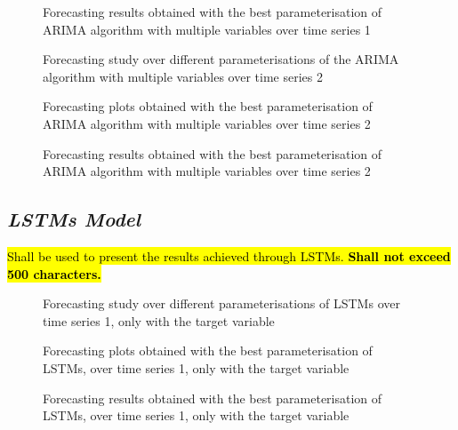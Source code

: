 \documentclass[10pt]{extarticle}
\newcommand{\ctext}[3][RGB]{%
  \begingroup
  \definecolor{hlcolor}{#1}{#2}\sethlcolor{hlcolor}%
  \hl{#3}%
  \endgroup
}
\begin{document}
\begin{figure}[H]
\caption{Forecasting results obtained with the best parameterisation of ARIMA algorithm with multiple variables over time series 1}
\end{figure}

\begin{figure}[H]
\caption{Forecasting study over different parameterisations of the ARIMA algorithm with multiple variables over time series 2}
\end{figure}

\begin{figure}[H]
\caption{Forecasting plots obtained with the best parameterisation of ARIMA algorithm with multiple variables over time series 2}
\end{figure}

\begin{figure}[H]
\caption{Forecasting results obtained with the best parameterisation of ARIMA algorithm with multiple variables over time series 2}
\end{figure}

\subsection*{\textit{LSTMs Model}}
\ctext[RGB]{190,190,190}{Shall be used to present the results achieved through LSTMs.  \textbf{Shall not exceed 500 characters.}}

\begin{figure}[H]
\caption{Forecasting study over different parameterisations of LSTMs over time series 1, only with the target variable}
\end{figure}

\begin{figure}[H]
\caption{Forecasting plots obtained with the best parameterisation of LSTMs, over time series 1, only with the target variable}
\end{figure}

\begin{figure}[H]
\caption{Forecasting results obtained with the best parameterisation of LSTMs, over time series 1, only with the target variable}
\end{figure}
\end{document}
